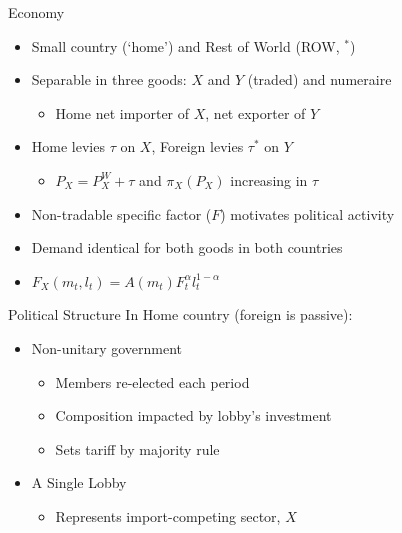 \documentclass[handout]{beamer}
\begin{document}
\begin{frame}{Economy}
\begin{itemize}[<+->]
	\item Small country (`home') and Rest of World (ROW, ${}^*$)
	\item Separable in three goods: $X$ and $Y$ (traded) and numeraire
		\begin{itemize}[<+->]
			\item Home net importer of $X$, net exporter of $Y$
		\end{itemize}
	\item Home levies $\tau$ on $X$, Foreign levies $\tau^*$ on $Y$
		\begin{itemize}[<+->]
			\item $P_X=P_X^W + \tau$ and $\pi_X(P_X)$ increasing in $\tau$
		\end{itemize}
	\item Non-tradable specific factor ($F$) motivates political activity
	\item Demand identical for both goods in both countries
	\item $F_X(m_t,l_t) = A(m_t) F_t^{\alpha} l_t^{1 - \alpha}$
\end{itemize}
\end{frame}


\begin{frame}{Political Structure}
In Home country (foreign is passive):
\pause
\begin{itemize}[<+->]
	\item Non-unitary government
		\begin{itemize}[<+->]
			\item Members re-elected each period
			\item Composition impacted by lobby's investment
			\item Sets tariff by majority rule
		\end{itemize}
	\item A Single Lobby
		\begin{itemize}
			\item Represents import-competing sector, $X$
		\end{itemize}	
\end{itemize}

\end{frame}
\end{document}
